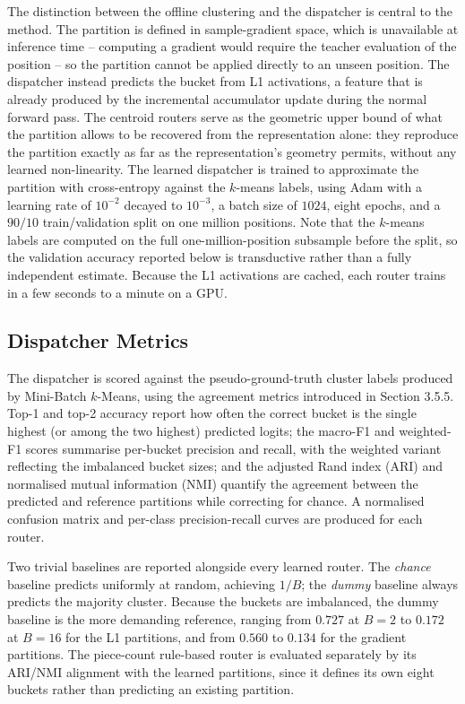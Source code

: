 The distinction between the offline clustering and the dispatcher is central to the method. The partition is defined in sample-gradient space, which is unavailable at inference time -- computing a gradient would require the teacher evaluation of the position -- so the partition cannot be applied directly to an unseen position. The dispatcher instead predicts the bucket from L1 activations, a feature that is already produced by the incremental accumulator update during the normal forward pass. The centroid routers serve as the geometric upper bound of what the partition allows to be recovered from the representation alone: they reproduce the partition exactly as far as the representation's geometry permits, without any learned non-linearity. The learned dispatcher is trained to approximate the partition with cross-entropy against the $k$-means labels, using Adam with a learning rate of $10^{-2}$ decayed to $10^{-3}$, a batch size of $1024$, eight epochs, and a $90/10$ train/validation split on one million positions. Note that the $k$-means labels are computed on the full one-million-position subsample before the split, so the validation accuracy reported below is transductive rather than a fully independent estimate. Because the L1 activations are cached, each router trains in a few seconds to a minute on a GPU.

\subsection{Dispatcher Metrics}

The dispatcher is scored against the pseudo-ground-truth cluster labels produced by Mini-Batch $k$-Means, using the agreement metrics introduced in Section 3.5.5. Top-1 and top-2 accuracy report how often the correct bucket is the single highest (or among the two highest) predicted logits; the macro-F1 and weighted-F1 scores summarise per-bucket precision and recall, with the weighted variant reflecting the imbalanced bucket sizes; and the adjusted Rand index (ARI) and normalised mutual information (NMI) quantify the agreement between the predicted and reference partitions while correcting for chance. A normalised confusion matrix and per-class precision-recall curves are produced for each router.

Two trivial baselines are reported alongside every learned router. The \emph{chance} baseline predicts uniformly at random, achieving $1/B$; the \emph{dummy} baseline always predicts the majority cluster. Because the buckets are imbalanced, the dummy baseline is the more demanding reference, ranging from $0.727$ at $B=2$ to $0.172$ at $B=16$ for the L1 partitions, and from $0.560$ to $0.134$ for the gradient partitions. The piece-count rule-based router is evaluated separately by its ARI/NMI alignment with the learned partitions, since it defines its own eight buckets rather than predicting an existing partition.

